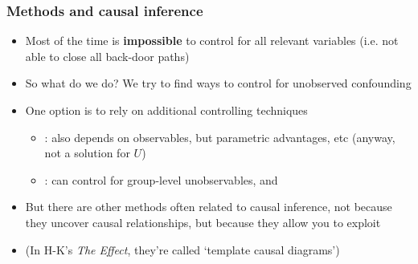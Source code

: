 \documentclass[aspectratio=43]{beamer}
\begin{document}
\begin{frame}
\frametitle{Methods and causal inference}
\centering

\begin{itemize}
  \item Most of the time is \textbf{impossible} to control for all relevant variables (i.e. not able to close all back-door paths)
  \item So what do we do? We try to find ways to control for unobserved confounding
  \item One option is to rely on additional controlling techniques
  \begin{itemize}
    \item {}: also depends on observables, but parametric advantages, etc (anyway, not a solution for $U$)
    \item {}: can control for group-level unobservables, and
  \end{itemize}



  \item But there are other methods often related to causal inference, not because they uncover causal relationships, but because they allow you to exploit 
  \item {\small (In H-K's \textit{The Effect}, they're called `template causal diagrams')}
\end{itemize}

\end{frame}
\end{document}
